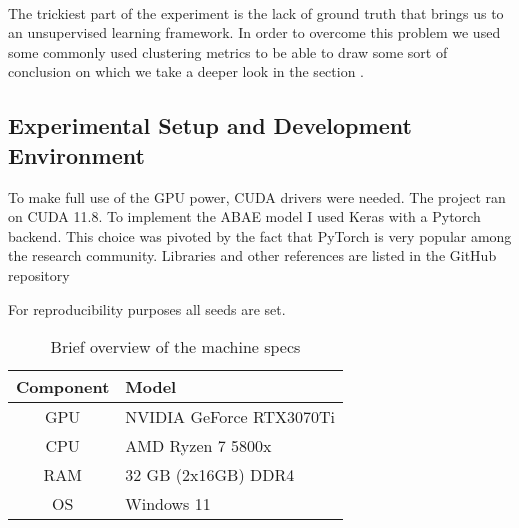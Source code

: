 \paragraph{}
The trickiest part of the experiment is the lack of ground truth that brings us to an unsupervised learning framework.
In order to overcome this problem we used some commonly used clustering metrics to be able to draw some sort of conclusion on which we
take a deeper look in the section .%

\subsection{Experimental Setup and Development Environment}
To make full use of the GPU power, CUDA drivers were needed.
The project ran on CUDA 11.8.
To implement the ABAE model I used Keras with a Pytorch backend.
This choice was pivoted by the fact that PyTorch is very popular among the research community.
Libraries and other references are listed in the GitHub repository\cite{Fichera_Muffin_vs_Chihuahua_2024}

For reproducibility purposes all seeds are set.

\begin{center}
    \begin{table}
        \begin{tabular}{|c l|}
            \hline
            Component & Model \\ [0.5ex]
            \hline\hline
            GPU       & NVIDIA GeForce RTX3070Ti \\
            \hline
            CPU       & AMD Ryzen 7 5800x        \\
            \hline
            RAM       & 32 GB (2x16GB) DDR4      \\
            \hline
            OS        & Windows 11               \\
            \hline
        \end{tabular}
        \caption{Brief overview of the machine specs}
        \label{specs}

    \end{table}

\end{center}


